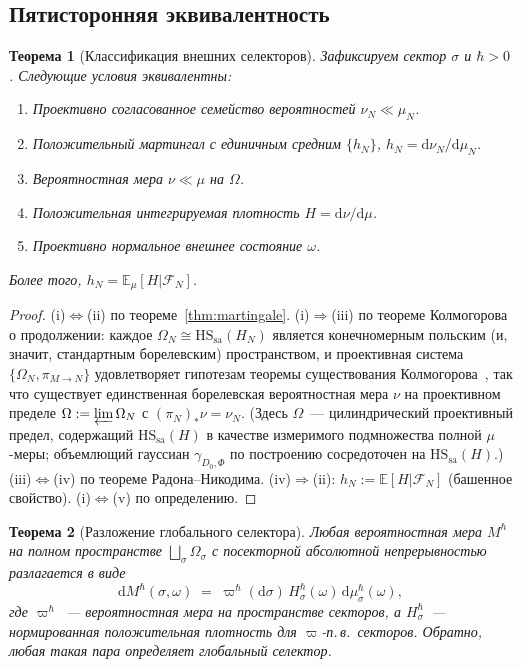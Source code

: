 \documentclass[12pt,a4paper]{article}
\theoremstyle{plain}
\newtheorem{theorem}{Теорема}[section]
\theoremstyle{definition}
\theoremstyle{remark}
\newcommand{\dd}{\mathrm{d}}
\newcommand{\HS}{\mathrm{HS}}
\newcommand{\sa}{\mathrm{sa}}
\newcommand{\cF}{\mathcal{F}}
\newcommand{\E}{\mathbb{E}}
\begin{document}
\subsection{Пятисторонняя эквивалентность}

\begin{theorem}[Классификация внешних селекторов]
\label{thm:external-classification}
Зафиксируем сектор $\sigma$ и $\hbar > 0$.  Следующие условия
эквивалентны:
\begin{enumerate}[label=\textup{(\roman*)},leftmargin=2.5em]
  \item Проективно согласованное семейство вероятностей
    $\nu_N \ll \mu_N$.
  \item Положительный мартингал с единичным средним $\{h_N\}$,
    $h_N = \dd\nu_N/\dd\mu_N$.
  \item Вероятностная мера $\nu \ll \mu$ на $\Omega$.
  \item Положительная интегрируемая плотность $H = \dd\nu/\dd\mu$.
  \item Проективно нормальное внешнее состояние $\omega$.
\end{enumerate}
Более того, $h_N = \E_\mu[H|\cF_N]$.
\end{theorem}

\begin{proof}
(i)$\Leftrightarrow$(ii) по теореме~\ref{thm:martingale}.
(i)$\Rightarrow$(iii) по теореме Колмогорова о продолжении:
каждое $\Omega_N \cong \HS_\sa(H_N)$ является конечномерным
польским (и, значит, стандартным борелевским) пространством,
и проективная система $\{\Omega_N, \pi_{M\to N}\}$ удовлетворяет
гипотезам теоремы существования
Колмогорова~\cite{Parthasarathy:1967}, так что существует
единственная борелевская вероятностная мера $\nu$ на проективном
пределе $\Omega := \varprojlim \Omega_N$ с
$(\pi_N)_*\nu = \nu_N$.  (Здесь $\Omega$~--- цилиндрический
проективный предел, содержащий $\HS_\sa(H)$ в качестве измеримого
подмножества полной $\mu$-меры; объемлющий гауссиан
$\gamma_{D_0,\Phi}$ по построению сосредоточен на $\HS_\sa(H)$.)
(iii)$\Leftrightarrow$(iv) по теореме Радона--Никодима.
(iv)$\Rightarrow$(ii): $h_N := \E[H|\cF_N]$ (башенное свойство).
(i)$\Leftrightarrow$(v) по определению.
\end{proof}

\begin{theorem}[Разложение глобального селектора]
\label{thm:global-selector}
Любая вероятностная мера $M^\hbar$ на полном пространстве
$\bigsqcup_\sigma \Omega_\sigma$ с посекторной абсолютной
непрерывностью разлагается в виде
\begin{equation}
  \dd M^\hbar(\sigma,\omega)
  \;=\; \varpi^\hbar(\dd\sigma)\,H_\sigma^\hbar(\omega)\,
  \dd\mu_\sigma^\hbar(\omega),
\end{equation}
где $\varpi^\hbar$~--- вероятностная мера на пространстве секторов,
а $H_\sigma^\hbar$~--- нормированная положительная плотность
для $\varpi$-п.\,в.\ секторов.  Обратно, любая такая пара определяет
глобальный селектор.
\end{theorem}
\end{document}
